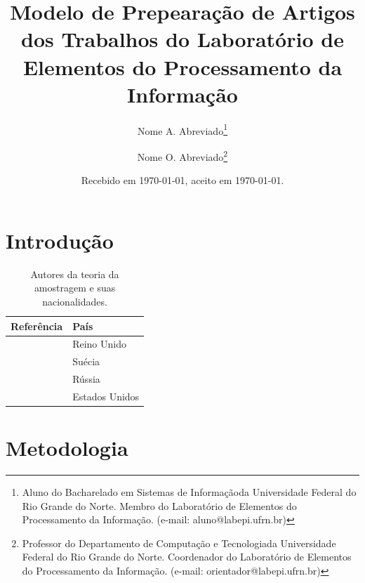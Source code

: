 \documentclass[11pt,a4paper]{article}
\newcommand{\UFRN}{Universidade Federal do Rio Grande do Norte}
\newcommand{\DCT}{Departamento de Computação e Tecnologia}
\newcommand{\BSI}{Bacharelado em Sistemas de Informação}
\newcommand{\LABEPI}{Laboratório de Elementos do Processamento da Informação}
\begin{document}
\linenumbers

\title{Modelo de Prepearação de Artigos dos Trabalhos do Laboratório de
    Elementos do Processamento da Informação}

\author{%
    Nome A. Abreviado\footnote{Aluno do \BSI da \UFRN.
        Membro do \LABEPI.
        (e-mail: aluno@labepi.ufrn.br)} \and
    Nome O. Abreviado\footnote{Professor do \DCT da \UFRN.
        Coordenador do \LABEPI.
        (e-mail: orientador@labepi.ufrn.br)}}

\date{\footnotesize%
    Recebido em \today,
    aceito em \today.}

\maketitle

\begin{abstract}
\lipsum[1]
\end{abstract}

\pagestyle{labepi}

\section{Introdução}

\lipsum[1]

\begin{table}[ht]
\centering
\begin{tabular}{ll}
\toprule
Referência                        & País \\
\midrule
\cite{whittaker1915interpolation} & Reino Unido \\
\cite{nyquist1928telegraph}       & Suécia \\
\cite{kotelnikov1933capacity}     & Rússia \\
\cite{shannon1949communication}   & Estados Unidos \\
\bottomrule
\end{tabular}
\caption[Autores da teoria da amostragem]
    {Autores da teoria da amostragem e suas nacionalidades.}
\label{tab:autor-amostragem}
\end{table}

\lipsum[4]

\section{Metodologia}
\label{sec:2:metodologia}
\end{document}
